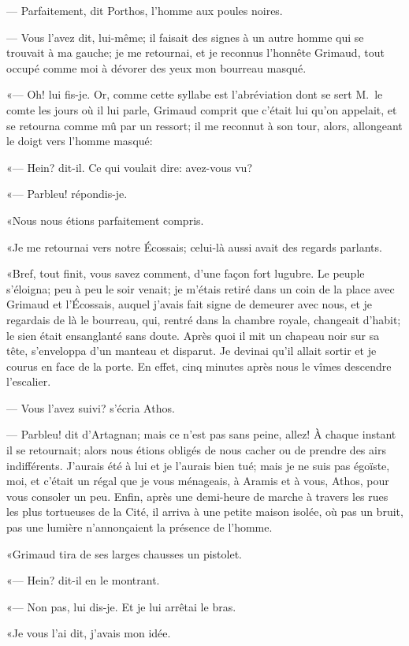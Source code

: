 — Parfaitement, dit Porthos, l'homme aux poules noires.

— Vous l'avez dit, lui-même; il faisait des signes à un autre homme qui se trouvait à ma gauche; je me retournai, et je reconnus l'honnête Grimaud, tout occupé comme moi à dévorer des yeux mon bourreau masqué.

«— Oh! lui fis-je. Or, comme cette syllabe est l'abréviation dont se sert M.~le comte les jours où il lui parle, Grimaud comprit que c'était lui qu'on appelait, et se retourna comme mû par un ressort; il me reconnut à son tour, alors, allongeant le doigt vers l'homme masqué:

«— Hein? dit-il. Ce qui voulait dire: avez-vous vu?

«— Parbleu! répondis-je.

«Nous nous étions parfaitement compris.

«Je me retournai vers notre Écossais; celui-là aussi avait des regards parlants.

«Bref, tout finit, vous savez comment, d'une façon fort lugubre. Le peuple s'éloigna; peu à peu le soir venait; je m'étais retiré dans un coin de la place avec Grimaud et l'Écossais, auquel j'avais fait signe de demeurer avec nous, et je regardais de là le bourreau, qui, rentré dans la chambre royale, changeait d'habit; le sien était ensanglanté sans doute. Après quoi il mit un chapeau noir sur sa tête, s'enveloppa d'un manteau et disparut. Je devinai qu'il allait sortir et je courus en face de la porte. En effet, cinq minutes après nous le vîmes descendre l'escalier.

— Vous l'avez suivi? s'écria Athos.

— Parbleu! dit d'Artagnan; mais ce n'est pas sans peine, allez! À chaque instant il se retournait; alors nous étions obligés de nous cacher ou de prendre des airs indifférents. J'aurais été à lui et je l'aurais bien tué; mais je ne suis pas égoïste, moi, et c'était un régal que je vous ménageais, à Aramis et à vous, Athos, pour vous consoler un peu. Enfin, après une demi-heure de marche à travers les rues les plus tortueuses de la Cité, il arriva à une petite maison isolée, où pas un bruit, pas une lumière n'annonçaient la présence de l'homme.

«Grimaud tira de ses larges chausses un pistolet.

«— Hein? dit-il en le montrant.

«— Non pas, lui dis-je. Et je lui arrêtai le bras.

«Je vous l'ai dit, j'avais mon idée.


